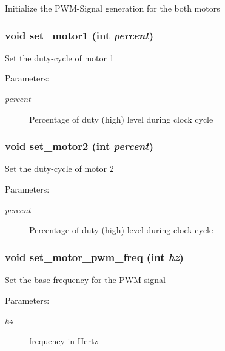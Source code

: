 Initialize the PWM-Signal generation for the both motors 
\subsubsection{\setlength{\rightskip}{0pt plus 5cm}void set\_\-motor1 (int {\em percent})}\label{group__Motor_g15152cbf837dcaebad4d2bae37fafe96}


Set the duty-cycle of motor 1 \begin{Desc}
\item[Parameters:]
\begin{description}
\item[{\em percent}]Percentage of duty (high) level during clock cycle \end{description}
\end{Desc}
\subsubsection{\setlength{\rightskip}{0pt plus 5cm}void set\_\-motor2 (int {\em percent})}\label{group__Motor_gd886695fc46c779fc3331e68715f9346}


Set the duty-cycle of motor 2 \begin{Desc}
\item[Parameters:]
\begin{description}
\item[{\em percent}]Percentage of duty (high) level during clock cycle \end{description}
\end{Desc}
\subsubsection{\setlength{\rightskip}{0pt plus 5cm}void set\_\-motor\_\-pwm\_\-freq (int {\em hz})}\label{group__Motor_ge7557fa03c837f612c0acb62a24c1474}


Set the base frequency for the PWM signal \begin{Desc}
\item[Parameters:]
\begin{description}
\item[{\em hz}]frequency in Hertz \end{description}
\end{Desc}
